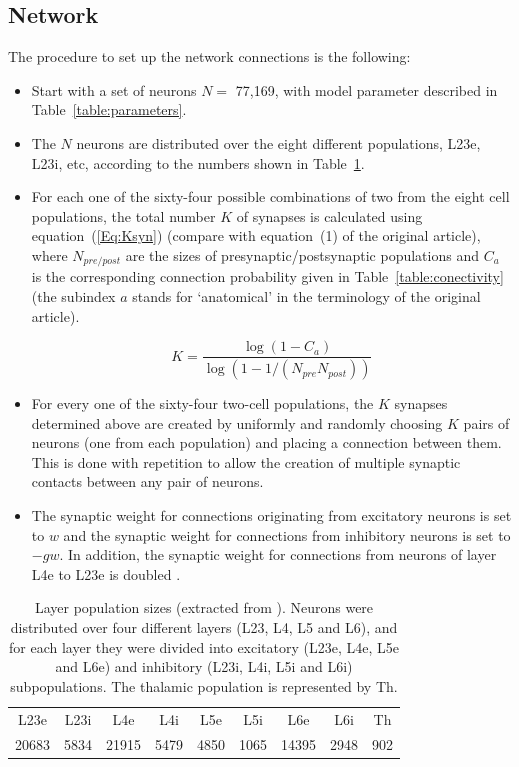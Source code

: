 \documentclass[10pt,a4paper,onecolumn]{article}
\begin{document}
\subsection{Network}
The procedure to set up the network connections is the following: 
\begin{itemize}
\item Start with a set of neurons $N=$ 77,169, with model parameter described in Table~\ref{table:parameters}.

\item The $N$ neurons are distributed over the eight different populations, L23e, L23i, etc, according to the numbers shown in Table~\ref{table:population}.

\item For each one of the sixty-four possible combinations of two from the eight cell populations, the total number $K$ of synapses is calculated using equation~(\ref{Eq:Ksyn}) (compare with equation~(1) of the original article), where $N_{pre/post}$ are the sizes of presynaptic/postsynaptic populations and $C_a$ is the corresponding connection probability given in Table~\ref{table:conectivity} (the subindex $a$ stands for `anatomical' in the terminology of the original article).

\begin{equation}
\label{Eq:Ksyn}
K = \frac{\log(1 - C_a)}{\log(1-1/(N_{pre}N_{post}))}
\end{equation}

\item For every one of the sixty-four two-cell populations, the $K$ synapses determined above are created by uniformly and randomly choosing $K$ pairs of neurons (one from each population) and placing a connection between them. This is done with repetition to allow the creation of multiple synaptic contacts between any pair of neurons. 

\item The synaptic weight for connections originating from excitatory neurons is set to $w$ and the synaptic weight for connections from inhibitory neurons is set to $-gw$. In addition, the synaptic weight for connections from neurons of layer L4e to L23e is doubled \cite{potjans2014,wagatsuma2011}.
\end{itemize}

\begin{table}[!ht]
  \caption{\label{table:population} Layer population sizes (extracted from \cite{potjans2014}). Neurons were distributed over four different layers (L23, L4, L5 and L6), and for each layer they were divided into excitatory (L23e, L4e, L5e and L6e) and inhibitory (L23i, L4i, L5i and L6i) subpopulations. The thalamic population is represented by Th.}
 \begin{center}
  \begin{tabular}{ccccccccc}
   \toprule
   \midrule
 L23e & L23i & L4e & L4i & L5e & L5i & L6e & L6i & Th\tabularnewline
 20683 & 5834 & 21915 & 5479 & 4850 & 1065 & 14395 & 2948 & 902\tabularnewline
   \bottomrule
  \end{tabular}
 \end{center}
\end{table}
\end{document}
